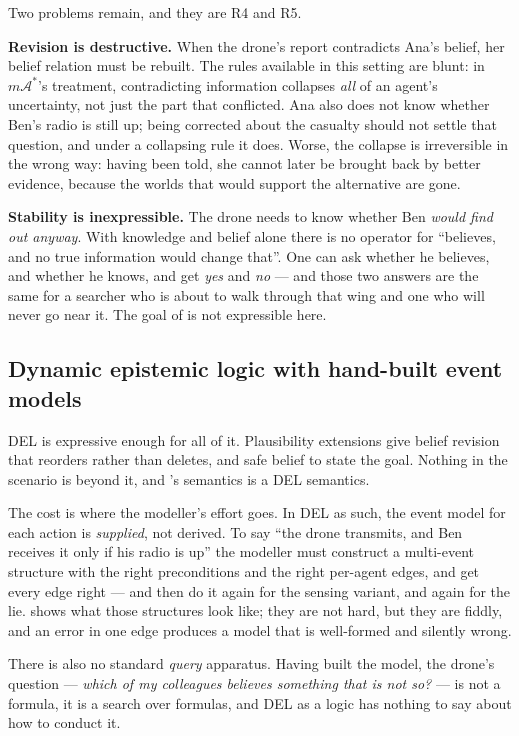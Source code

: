 \documentclass[11pt,a4paper]{article}
\begin{document}
Two problems remain, and they are R4 and R5.

\textbf{Revision is destructive.} When the drone's report contradicts Ana's belief, her belief
relation must be rebuilt. The rules available in this setting are blunt: in
$m\mathcal{A}^*$'s treatment, contradicting information collapses \emph{all} of an agent's
uncertainty, not just the part that conflicted. Ana also does not know whether Ben's radio is
still up; being corrected about the casualty should not settle that question, and under a
collapsing rule it does. Worse, the collapse is irreversible in the wrong way:
having been told, she cannot later be brought back by better evidence, because the worlds
that would support the alternative are gone.

\textbf{Stability is inexpressible.} The drone needs to know whether Ben \emph{would find out
anyway}. With knowledge and belief alone there is no operator for ``believes, and no true
information would change that''. One can ask whether he believes, and whether he knows, and get
\emph{yes} and \emph{no} --- and those two answers are the same for a searcher who is about to
walk through that wing and one who will never go near it. The goal of  is not
expressible here.

\subsection{Dynamic epistemic logic with hand-built event models}

DEL \citep{baltag1998,vanditmarsch2007} is expressive enough for all of it. Plausibility
extensions \citep{baltag2006,baltag2008} give belief revision that reorders rather than
deletes, and safe belief to state the goal. Nothing in the scenario is beyond it, and
\delhi's semantics is a DEL semantics.

The cost is where the modeller's effort goes. In DEL as such, the event model for each action
is \emph{supplied}, not derived. To say ``the drone transmits, and Ben receives it only if his
radio is up'' the modeller must construct a multi-event structure with the right preconditions
and the right per-agent edges, and get every edge right --- and then do it again for the sensing
variant, and again for the lie.  shows what
those structures look like; they are not hard, but they are fiddly, and an error in one edge
produces a model that is well-formed and silently wrong.

There is also no standard \emph{query} apparatus. Having built the model, the drone's
question --- \emph{which of my colleagues believes something that is not so?} --- is not a
formula, it is a search over formulas, and DEL as a logic has nothing to say about how to
conduct it.
\end{document}
